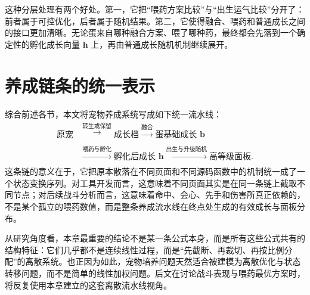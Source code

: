 这种分层处理有两个好处。第一，它把“喂药方案比较”与“出生运气比较”分开了：前者属于可控优化，后者属于随机结果。第二，它使得融合、喂药和普通成长之间的接口更加清晰。无论蛋来自哪种融合方案、喂了哪种药，最终都会先落到一个确定性的孵化成长向量 $\bm{h}$ 上，再由普通成长随机机制继续展开。

\section{养成链条的统一表示}

综合前述各节，本文将宠物养成系统写成如下统一流水线：
\begin{equation}
    \begin{aligned}
    \text{原宠} &\xrightarrow[]{\text{转生或保留}} \text{成长档} \xrightarrow[]{\text{融合}} \text{蛋基础成长 } \bm{b} \\
    &\xrightarrow[]{\text{喂药与孵化}} \text{孵化后成长 } \bm{h} \xrightarrow[]{\text{出生与升级随机}} \text{高等级面板}.
    \end{aligned}
\end{equation}
这条链的意义在于，它把原本散落在不同页面和不同源码函数中的机制统一成了一个状态变换序列。对工具开发而言，这意味着不同页面其实是在同一条链上截取不同节点；对后续战斗分析而言，这意味着命中、会心、先手和伤害所真正依赖的，不是某个孤立的喂药数值，而是整条养成流水线在终点处生成的有效成长与面板分布。

从研究角度看，本章最重要的结论不是某一条公式本身，而是所有这些公式共有的结构特征：它们几乎都不是连续线性过程，而是“先截断、再裁切、再按比例分配”的离散系统。也正因为如此，宠物培养问题天然适合被建模为离散优化与状态转移问题，而不是简单的线性加权问题。后文在讨论战斗表现与喂药最优方案时，将反复使用本章建立的这套离散流水线视角。
